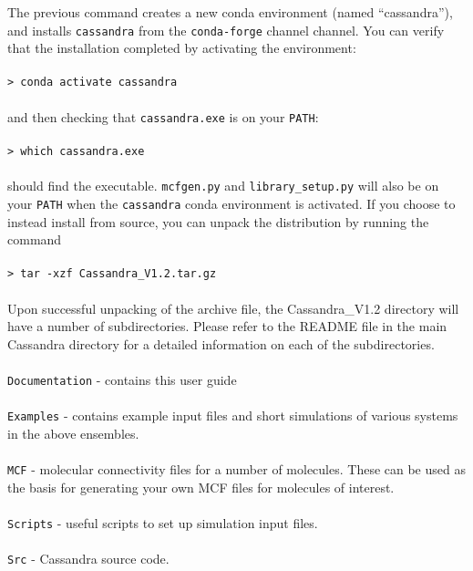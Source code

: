 The previous command creates a new conda environment (named ``cassandra''),
and installs \texttt{cassandra} from the \texttt{conda-forge} channel channel.
You can verify that the installation completed by activating the environment: \\ \\
%
\texttt{> conda activate cassandra} \\ \\
%
and then checking that \texttt{cassandra.exe} is on your \texttt{PATH}: \\ \\
%
\texttt{> which cassandra.exe} \\ \\
%
should find the executable. \texttt{mcfgen.py} and \texttt{library\_setup.py}
will also be on your \texttt{PATH} when the \texttt{cassandra} conda environment
is activated. If you choose to instead install from source,
you can unpack the distribution by running the command \\ \\
%
\texttt{> tar -xzf Cassandra\_V1.2.tar.gz} \\ \\
%
Upon successful unpacking of the archive file, the Cassandra\_V1.2 directory will have a number of subdirectories. Please refer to the README file in the main Cassandra directory for a detailed information on each of the subdirectories. \\ \\
%
\texttt{Documentation} - contains this user guide\\ \\
%
\texttt{Examples} - contains example input files and short simulations of various systems in the above ensembles. \\ \\
%
\texttt{MCF} - molecular connectivity files for a number of
molecules. These can be used as the basis for generating your own MCF files for
molecules of interest. \\ \\ 
%
\texttt{Scripts} - useful scripts to set up simulation input files. \\ \\
%
\texttt{Src} - Cassandra source code. \\ \\

